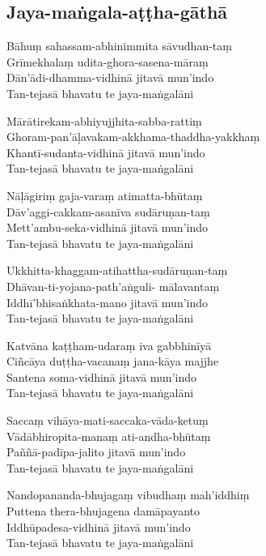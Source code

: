 
\enlargethispage{\baselineskip}

\subsection{Jaya-maṅgala-aṭṭha-gāthā}
\label{bahum}


\begin{paritta}
Bāhuṃ sahassam-abhinimmita sāvudhan-taṃ\\
Grīmekhalaṃ udita-ghora-sasena-māraṃ\\
Dān'ādi-dhamma-vidhinā jitavā mun'indo\\
Tan-tejasā bhavatu te jaya-maṅgalāni

Mārātirekam-abhiyujjhita-sabba-rattiṃ\\
Ghoram-pan'āḷavakam-akkhama-thaddha-yakkhaṃ\\
Khantī-sudanta-vidhinā jitavā mun'indo\\
Tan-tejasā bhavatu te jaya-maṅgalāni

\clearpage

Nāḷāgiriṃ gaja-varaṃ atimatta-bhūtaṃ\\
Dāv'aggi-cakkam-asanīva sudāruṇan-taṃ\\
Mett'ambu-seka-vidhinā jitavā mun'indo\\
Tan-tejasā bhavatu te jaya-maṅgalāni

Ukkhitta-khaggam-atihattha-sudāruṇan-taṃ\\
Dhāvan-ti-yojana-path'aṅguli- mālavantaṃ\\
Iddhī'bhisaṅkhata-mano jitavā mun'indo\\
Tan-tejasā bhavatu te jaya-maṅgalāni

Katvāna kaṭṭham-udaraṃ iva gabbhinīyā\\
Ciñcāya duṭṭha-vacanaṃ jana-kāya majjhe\\
Santena soma-vidhinā jitavā mun'indo\\
Tan-tejasā bhavatu te jaya-maṅgalāni

Saccaṃ vihāya-mati-saccaka-vāda-ketuṃ\\
Vādābhiropita-manaṃ ati-andha-bhūtaṃ\\
Paññā-padīpa-jalito jitavā mun'indo\\
Tan-tejasā bhavatu te jaya-maṅgalāni

Nandopananda-bhujagaṃ vibudhaṃ mah'iddhiṃ\\
Puttena thera-bhujagena damāpayanto\\
Iddhūpadesa-vidhinā jitavā mun'indo\\
Tan-tejasā bhavatu te jaya-maṅgalāni


\end{paritta}
